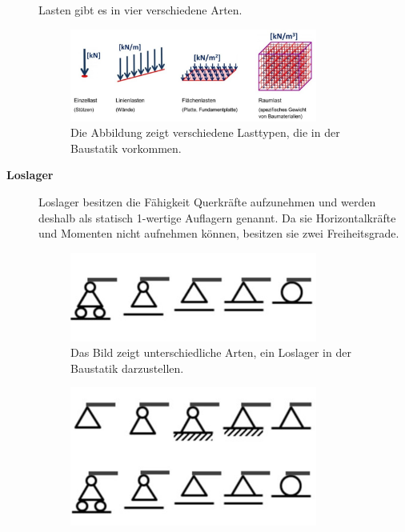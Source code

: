\begin{description}
Lasten gibt es in vier verschiedene Arten.
\begin{figure} [h]
	\centering
	\includegraphics[width=0.8\textwidth]{papers/balken/images/teil1/Lasten.jpg}
	\caption{Die Abbildung zeigt verschiedene Lasttypen, die in der Baustatik vorkommen.}
	\label{fig:Die Abbildung zeigt verschiedene Lasttypen, die in der Baustatik vorkommen.}
\end{figure}
\item[\textbf{Loslager}] Loslager besitzen die Fähigkeit Querkräfte aufzunehmen und werden deshalb als statisch 1-wertige Auflagern genannt.
Da sie Horizontalkräfte und Momenten nicht aufnehmen können, besitzen sie zwei Freiheitsgrade.
\begin{figure} [h]
	\centering
	\includegraphics[width=0.8\textwidth]{papers/balken/images/teil1/Loslager.jpg}
	\caption{Das Bild zeigt unterschiedliche Arten, ein Loslager in der Baustatik darzustellen.}
	\label{fig:Das Bild zeigt unterschiedliche Arten, ein Loslager in der Baustatik darzustellen.}
\end{figure}
\begin{figure} [h]
\centering
\includegraphics[width=0.8\textwidth]{papers/balken/images/teil1/Gegenueberstellung.png}

\end{figure}
\end{description}
